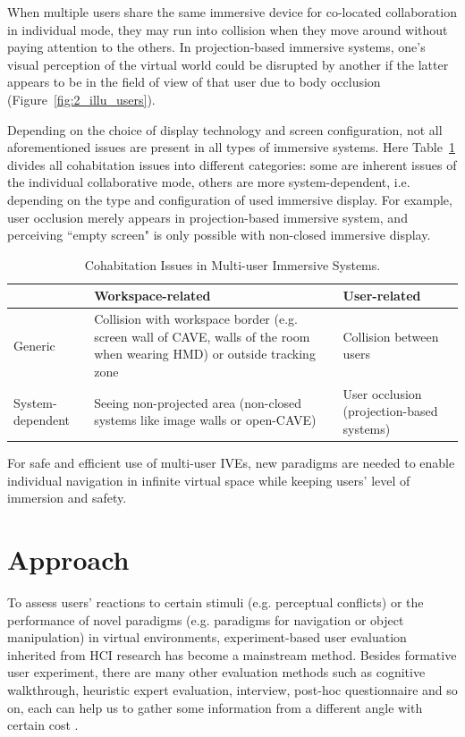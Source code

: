 When multiple users share the same immersive device for co-located collaboration in individual mode, they may run into collision when they move around without paying attention to the others. In projection-based immersive systems, one's visual perception of the virtual world could be disrupted by another if the latter appears to be in the field of view of that user due to body occlusion (Figure~\ref{fig:2_illu_users}).

Depending on the choice of display technology and screen configuration, not all aforementioned issues are present in all types of immersive systems. Here Table~\ref{tab:cohab_issues} divides all cohabitation issues into different categories: some are inherent issues of the individual collaborative mode, others are more system-dependent, i.e. depending on the type and configuration of used immersive display. For example, user occlusion merely appears in projection-based immersive system, and perceiving ``empty screen" is only possible with non-closed immersive display. 

\begin{table}[htb]
\renewcommand{\arraystretch}{1.3}
\caption{Cohabitation Issues in Multi-user Immersive Systems.}
\label{tab:cohab_issues}
\centering
\small
\begin{tabular}{p{2.5cm} p{6cm} p{5.5cm}}
  \hline
   & Workspace-related & User-related \\ \hline
  Generic & Collision with workspace border (e.g. screen wall of CAVE, walls of the room when wearing HMD) or outside tracking zone & Collision between users \\ \hline
  System-dependent & Seeing non-projected area (non-closed systems like image walls or open-CAVE) & User occlusion (projection-based systems) \\ \hline
\end{tabular}
\end{table}

For safe and efficient use of multi-user IVEs, new paradigms are needed to enable individual navigation in infinite virtual space while keeping users' level of immersion and safety.


\section{Approach}
To assess users' reactions to certain stimuli (e.g. perceptual conflicts) or the performance of novel paradigms (e.g. paradigms for navigation or object manipulation) in virtual environments, experiment-based user evaluation inherited from HCI research has become a mainstream method. Besides formative user experiment, there are many other evaluation methods such as cognitive walkthrough, heuristic expert evaluation, interview, post-hoc questionnaire and so on, each can help us to gather some information from a different angle with certain cost \citep{Bowman2002Survey}.

